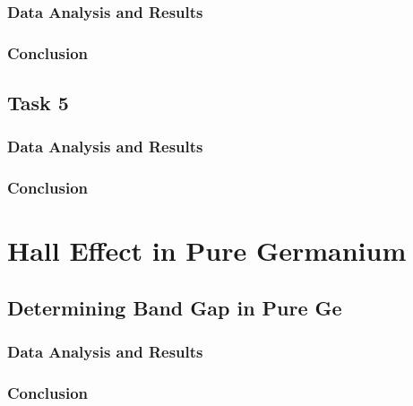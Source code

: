 \documentclass[a4paper]{article}
\begin{document}
\subsubsection{Data Analysis and Results}

\subsubsection{Conclusion}

\subsection{Task 5}

\subsubsection{Data Analysis and Results}

\subsubsection{Conclusion}

\section{Hall Effect in Pure Germanium}

\subsection{Determining Band Gap in Pure Ge}

\subsubsection{Data Analysis and Results}

\subsubsection{Conclusion}
\end{document}
